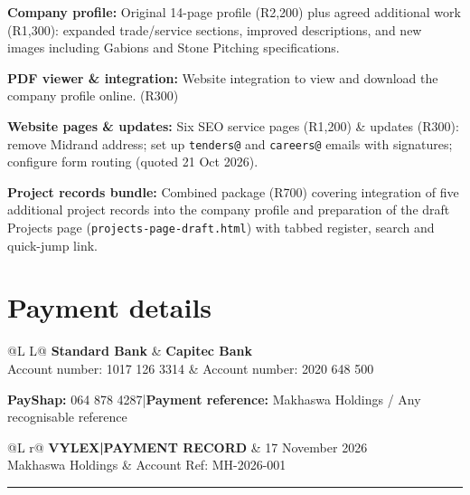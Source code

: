 \documentclass[11pt,a4paper]{article}
\newcommand{\brandrule}{\par{\color{orange}\rule{\textwidth}{1.5pt}}\par}
\begin{document}
{\small
\textbf{Company profile:} Original 14-page profile (R2,200) plus agreed additional work (R1,300): expanded trade/service sections, improved descriptions, and new images including Gabions and Stone Pitching specifications.

\textbf{PDF viewer \& integration:} Website integration to view and download the company profile online. (R300)

\textbf{Website pages \& updates:} Six SEO service pages (R1,200) \& updates (R300): remove Midrand address; set up \texttt{tenders@} and \texttt{careers@} emails with signatures; configure form routing (quoted 21 Oct 2026).

\textbf{Project records bundle:} Combined package (R700) covering integration of five additional project records into the company profile and preparation of the draft Projects page (\texttt{projects-page-draft.html}) with tabbed register, search and quick-jump link.}

\section*{Payment details}
{\small
\begin{tabularx}{\textwidth}{@{}L L@{}}
\textbf{\color{navy}Standard Bank} & \textbf{\color{navy}Capitec Bank}\\
Account number: 1017 126 3314 & Account number: 2020 648 500
\end{tabularx}
\textbf{PayShap:} 064 878 4287\enspace|\enspace\textbf{Payment reference:} Makhaswa Holdings / Any recognisable reference}

\newpage

\begin{tabularx}{\textwidth}{@{}L r@{}}
{\large\bfseries\color{navy}VYLEX\enspace|\enspace PAYMENT RECORD}
& {\small\color{muted}17 November 2026}\\
{\small Makhaswa Holdings} & {\small Account Ref: MH-2026-001}
\end{tabularx}
\brandrule
\end{document}
